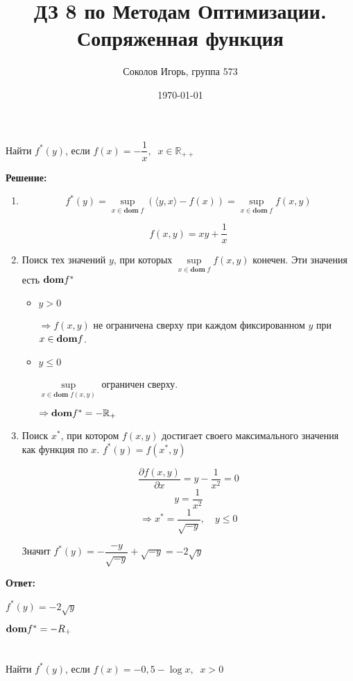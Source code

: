 \documentclass[a4paper,12pt]{article}
\author{Соколов Игорь, группа 573}
\title{ДЗ 8 по Методам Оптимизации. \newline Сопряженная функция}
\date{\today}
\newcommand{\p}{\partial}
\newcommand{\fr}{\frac}
\newcommand{\dfr}{\dfrac}
\newcommand{\bb}{\mathbb}
\begin{document}

\maketitle

\section{}
Найти $f^*(y)$, если $f(x) = -\dfrac{1}{x}, \;\; x\in \mathbb{R}_{++}$

\textbf{Решение:}

\begin{enumerate}
	\item $$f^*(y) = \sup\limits_{x \in \mathbf{dom} \; f} \left( \langle y,x\rangle - f(x)\right)  = \sup\limits_{x \in \mathbf{dom} \; f} f(x,y)$$
	
	$$f(x, y) = xy +\fr{1}{x}$$
	
	\item  Поиск тех значений $y$, при которых $ \sup\limits_{x \in \mathbf{dom} \; f} f(x,y)$ конечен. Эти значения есть ${\bf dom}f^*$
	
	\begin{itemize}
		\item $y > 0$
		
		$\Rightarrow f(x,y)$ не ограничена сверху при каждом фиксированном $y$ при $ x \in {\bf dom} f$.
		
		\item $y \le 0$
		
		$\sup\limits_{x \in \mathbf{dom} \; f(x,y)}$ ограничен сверху.
		
		$\Rightarrow {\bf dom}f^* = -\bb R_+$
	\end{itemize}
	\item Поиск $x^*$, при котором $f(x,y)$ достигает своего максимального значения как функция по $x$. $f^*(y) = f(x^*, y)$
	
	$$\fr{\p f(x, y)}{\p x} = y - \fr{1}{x^2} = 0$$
	$$y = \fr{1}{x^2}$$
	$$\Rightarrow x^* = \fr{1}{\sqrt{-y}}, \quad y\le 0$$
	
	Значит $f^*(y) = -\dfr{-y}{\sqrt{-y}} + \sqrt{-y} = -2\sqrt{y}$
	
\end{enumerate}

\textbf{Ответ:}

 $f^*(y) = -2\sqrt{y}$
 
 ${\bf dom}f^* = \bb -R_+$

\section{}
Найти $f^*(y)$, если $f(x) = -0,5 - \log x, \;\; x>0$
\end{document}
